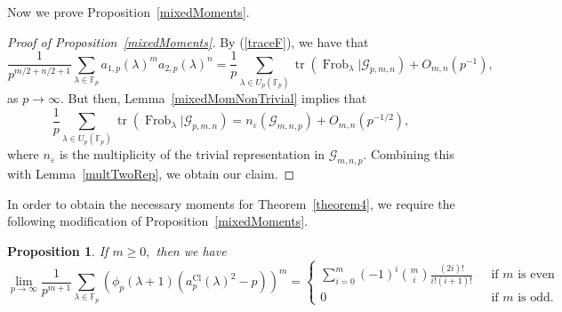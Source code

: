 \documentclass[12pt]{amsart}
\newtheorem{proposition}[theorem]{Proposition}
\theoremstyle{definition}
\theoremstyle{remark}
\numberwithin{equation}{section}
\def\F{{\mathbb F}}
\def\F{\mathbb{F}}
\DeclareMathOperator{\Frob}{Frob}
\DeclareMathOperator{\tr}{tr}
\DeclareMathOperator{\Cl}{Cl}
\begin{document}
Now we prove Proposition~\ref{mixedMoments}.

\begin{proof}[Proof of Proposition~\ref{mixedMoments}]
By (\ref{traceF}), we have that
$$
\frac{1}{p^{m/2+n/2+1}}\sum\limits_{\lambda\in \F_p}a_{1,p}(\lambda)^m a_{2,p}(\lambda)^n=\frac{1}{p}\sum\limits_{\lambda\in U_p(\F_p)}\tr(\Frob_\lambda|\mathcal{G}_{p,m,n})+O_{m,n}(p^{-1}),
$$
as $p\to\infty.$ But then, Lemma~\ref{mixedMomNonTrivial} implies that
$$
\frac{1}{p}\sum\limits_{\lambda\in U_p(\F_p)}\tr(\Frob_\lambda|\mathcal{G}_{p,m,n}) = n_{\varepsilon}(\mathcal{G}_{m,n,p})+O_{m,n}(p^{-1/2}),
$$
where $n_{\varepsilon}$ is the multiplicity of the trivial representation in $\mathcal{G}_{m,n,p}.$ Combining this with Lemma~\ref{multTwoRep}, we obtain our claim.
\end{proof}

In order to obtain the necessary moments for Theorem~\ref{theorem4}, we require the following modification of Proposition~\ref{mixedMoments}.

\begin{proposition}\label{3F2MomEC}
    If $m\geq 0,$ then we have
    $$
    \lim\limits_{p\to\infty}\frac{1}{p^{m+1}}\sum\limits_{\lambda\in\F_p}(\phi_p(\lambda+1)(a_p^{\Cl}(\lambda)^2-p))^m=\begin{cases}
        \sum\limits_{i=0}^m (-1)^i\binom{m}{i}\frac{(2i)!}{i!(i+1)!} &\ \ \ \text{if }m\text{ is even} \\
        0 &\ \ \ \text{if }m\text{ is odd.}
    \end{cases}
    $$
\end{proposition}
\end{document}
